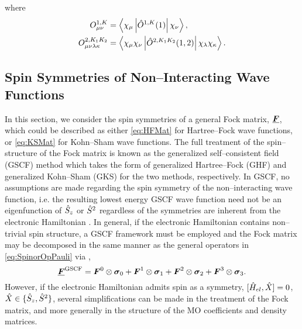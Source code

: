 where
\begin{align}
  O_{\mu\nu}^{1,K} &= \left\langle \chi_\mu \left\vert \hat{O}^{1,K}(1) \right\vert \chi_\nu \right\rangle,\\
  O_{\mu\nu\lambda\kappa}^{2,K_1K_2} &= \left\langle \chi_\mu\chi_\nu \left\vert \hat{O}^{2,K_1K_2}(1,2) \right\vert \chi_\lambda\chi_\kappa \right\rangle.
\end{align}




\subsection{Spin Symmetries of Non--Interacting Wave Functions} 

In this section, we consider the spin symmetries of a general Fock matrix, $\boldsymbol{\underline{F}}$, which could be described as either
\cref{eq:HFMat} for Hartree--Fock wave functions, or \cref{eq:KSMat} for Kohn--Sham wave functions.
The full treatment of the spin--structure of the Fock matrix is known as the generalized self--consistent field (GSCF) method
which takes the form of generalized Hartree--Fock (GHF) and generalized Kohn--Sham (GKS) for the two methods, respectively.
In GSCF, no assumptions are made regarding the spin symmetry of the non--interacting wave function, i.e. the resulting lowest 
energy
GSCF wave function need not be an eigenfunction of $\hat{S}_z$ or $\hat{S}^2$ regardless of the symmetries are inherent
from the electronic Hamiltonian . In general, if the electronic Hamiltonian contains non--trivial 
spin structure,
a GSCF framework must be employed and the Fock matrix may be decomposed in the same manner as the general operators
in \cref{eq:SpinorOpPauli} via ,
\begin{equation}
  \label{eq:GSCFFock}
  \boldsymbol{\underline{F}}^\mathrm{GSCF} = \boldsymbol{F}^0 \otimes \boldsymbol{\sigma}_{0} + \boldsymbol{F}^1 \otimes \boldsymbol{\sigma}_{1} + \boldsymbol{F}^2 \otimes \boldsymbol{\sigma}_{2} + \boldsymbol{F}^3 \otimes \boldsymbol{\sigma}_{3}.
\end{equation}
However, if the electronic Hamiltonian admits spin as a symmetry, 
$[\hat{H}_{el},\hat{X}] = 0$, $\hat{X} \in \{\hat{S}_z,\hat{S}^2\}$, several simplifications can be made in the treatment of the
Fock matrix, and more generally in the structure of the MO coefficients and density matrices.

